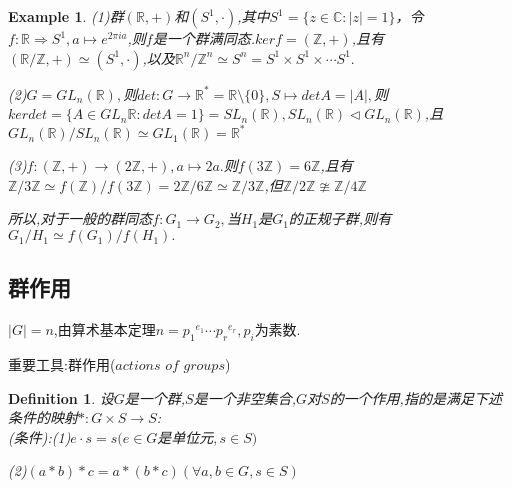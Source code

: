 \documentclass[UTF8]{article}
\newtheorem{defn}{Definition}[section]
\newtheorem{exa}{Example}[section]
\begin{document}
\begin{exa}
	
	(1)群$(\mathbb{R},+)$和$(S^1,\cdot)$,其中$S^1=\{z\in \mathbb{C}:|z|=1\}$，令$f:\mathbb{R}\Rightarrow S^1,a\mapsto e^{2\pi ia}$,则$f$是一个群满同态.$ker f=(\mathbb{Z},+)$,且有$(\mathbb{R}/\mathbb{Z},+)\simeq (S^1,\cdot)$,以及${\mathbb{R}}^n/{\mathbb{Z}}^n\simeq S^n=S^1\times S^1\times\cdots S^1. $
	
	(2)$G=GL_n(\mathbb{R}),$则$det:G\to \mathbb{R}^\ast=\mathbb{R}\setminus \{0\},S\mapsto detA=|A|,$则$ker det=\{A\in GL_n\mathbb{R}:detA=1\}=SL_n(\mathbb{R}),SL_n(\mathbb{R})\triangleleft GL_n(\mathbb{R})$,且$GL_n(\mathbb{R})/SL_n(\mathbb{R})\simeq GL_1(\mathbb{R})=\mathbb{R}^\ast$
	
	(3)$f:(\mathbb{Z},+)\to (2\mathbb{Z},+),a\mapsto 2a.$则$f(3\mathbb{Z})=6\mathbb{Z}$,且有$\mathbb{Z}/{3\mathbb{Z}}\simeq f(\mathbb{Z})/{f(3\mathbb{Z})}=2\mathbb{Z}/{6\mathbb{Z}}\simeq\mathbb{Z}/{3\mathbb{Z}}$,但$\mathbb{Z}/{2\mathbb{Z}}\ncong    \mathbb{Z}/{4\mathbb{Z}}$
	
	所以,对于一般的群同态$f:G_1\to G_2,$当$H_1$是$G_1$的正规子群,则有$G_1/H_1\simeq f(G_1)/f(H_1).$
\end{exa}

\subsection{群作用}
\normalsize

$|G|=n$,由算术基本定理$n={p_1}^{e_1}\cdots {p_r}^{e_r},p_i$为素数.

重要工具:群作用($actions$ $of$ $groups$)

\begin{defn}
	设$G$是一个群,$S$是一个非空集合,$G$对$S$的一个作用,指的是满足下述条件的映射$\ast:G\times S\rightarrow S$:\\
	(条件):(1)$e\cdot s=s(e\in G$是单位元$,s\in S)$
	
	(2)$(a\ast b)\ast c=a\ast (b\ast c)(\forall a,b\in G,s\in S)$
\end{defn}
\end{document}
